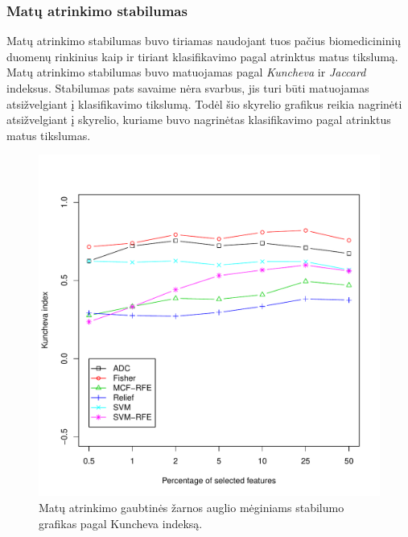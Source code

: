 \subsubsection{Matų atrinkimo stabilumas}

Matų atrinkimo stabilumas buvo tiriamas naudojant tuos pačius biomedicininių duomenų rinkinius kaip ir tiriant klasifikavimo pagal atrinktus matus tikslumą. Matų atrinkimo stabilumas buvo matuojamas pagal \textit{Kuncheva} ir \textit{Jaccard} indeksus. Stabilumas pats savaime nėra svarbus, jis turi būti matuojamas atsižvelgiant į klasifikavimo tikslumą. Todėl šio skyrelio grafikus reikia nagrinėti atsižvelgiant į skyrelio, kuriame buvo nagrinėtas klasifikavimo pagal atrinktus matus tikslumas.

\begin{figure}[H]
\begin{minipage}[b]{0.5\linewidth}
\centering
\includegraphics[width=.85\textwidth]{../bachelor/images/nncolon_robustness_kuncheva.pdf}
\caption{Matų atrinkimo gaubtinės žarnos auglio mėginiams stabilumo grafikas pagal Kuncheva indeksą.}
\label{fig:robk_colon}
\end{minipage}
\hspace{0.2cm}
\begin{minipage}[b]{0.5\linewidth}
\centering

\end{minipage}
\end{figure}
